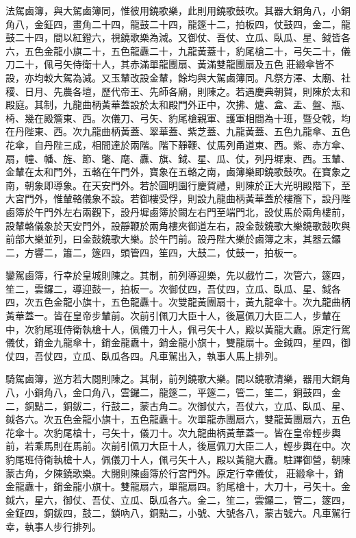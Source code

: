 \begin{pinyinscope}
法駕鹵簿，與大駕鹵簿同，惟彼用鐃歌樂，此則用鐃歌鼓吹。其器大銅角八，小銅角八，金鉦四，畫角二十四，龍鼓二十四，龍篴十二，拍板四，仗鼓四，金二，龍鼓二十四，間以紅鐙六，視鐃歌樂為減。又御仗、吾仗、立瓜、臥瓜、星、鉞皆各六，五色金龍小旗二十，五色龍纛二十，九龍黃蓋十，豹尾槍二十，弓矢二十，儀刀二十，佩弓矢侍衛十人，其赤滿單龍團扇、黃滿雙龍團扇及五色莊緞傘皆不設，亦均較大駕為減。又玉輦改設金輦，餘均與大駕鹵簿同。凡祭方澤、太廟、社稷、日月、先農各壇，歷代帝王、先師各廟，則陳之。若遇慶典朝賀，則陳於太和殿庭。其制，九龍曲柄黃華蓋設於太和殿門外正中，次拂、爐、盒、盂、盤、瓶、椅、幾在殿簷東、西。次儀刀、弓矢、豹尾槍親軍、護軍相間為十班，暨殳戟，均在丹陛東、西。次九龍曲柄黃蓋、翠華蓋、紫芝蓋、九龍黃蓋、五色九龍傘、五色花傘，自丹陛三成，相間達於兩階。階下靜鞭、仗馬列甬道東、西。紫、赤方傘、扇，幢、幡、旌、節、氅、麾、纛、旗、鉞、星、瓜、仗，列丹墀東、西。玉輦、金輦在太和門外，五輅在午門外，寶象在五輅之南，鹵簿樂即鐃歌鼓吹。在寶象之南，朝象即導象。在天安門外。若於圓明園行慶賀禮，則陳於正大光明殿階下，至大宮門外，惟輦輅儀象不設。若御樓受俘，則設九龍曲柄黃華蓋於樓簷下，設丹陛鹵簿於午門外左右兩觀下，設丹墀鹵簿於闕左右門至端門北，設仗馬於兩角樓前，設輦輅儀象於天安門外，設靜鞭於兩角樓夾御道左右，設金鼓鐃歌大樂鐃歌鼓吹與前部大樂並列，曰金鼓鐃歌大樂。於午門前。設丹陛大樂於鹵簿之末，其器云鑼二，方響二，簫二，篴四，頭管四，笙四，大鼓二，仗鼓一，拍板一。

鑾駕鹵簿，行幸於皇城則陳之。其制，前列導迎樂，先以戲竹二，次管六，篴四，笙二，雲鑼二，導迎鼓一，拍板一。次御仗四，吾仗四，立瓜、臥瓜、星、鉞各四，次五色金龍小旗十，五色龍纛十。次雙龍黃團扇十，黃九龍傘十。次九龍曲柄黃華蓋一。皆在皇帝步輦前。次前引佩刀大臣十人，後扈佩刀大臣二人，步輦在中，次豹尾班侍衛執槍十人，佩儀刀十人，佩弓矢十人，殿以黃龍大纛。原定行駕儀仗，銷金九龍傘十，銷金龍纛十，銷金龍小旗十，雙龍扇十。金鉞四，星四，御仗四，吾仗四，立瓜、臥瓜各四。凡車駕出入，執事人馬上排列。

騎駕鹵簿，巡方若大閱則陳之。其制，前列鐃歌大樂。間以鐃歌清樂，器用大銅角八，小銅角八，金口角八，雲鑼二，龍篴二，平篴二，管二，笙二，銅鼓四，金二，銅點二，銅鈸二，行鼓二，蒙古角二。次御仗六，吾仗六，立瓜、臥瓜、星、鉞各六。次五色金龍小旗十，五色龍纛十。次單龍赤團扇六，雙龍黃團扇六，五色花傘十。次豹尾槍十，弓矢十，儀刀十。次九龍曲柄黃華蓋一。皆在皇帝輕步輿前，若乘馬則在馬前。次前引佩刀大臣十人，後扈佩刀大臣二人，輕步輿在中。次豹尾班侍衛執槍十人，佩儀刀十人，佩弓矢十人，殿以黃龍大纛。駐蹕御營，朝陳蒙古角，夕陳鐃歌樂。大閱則陳鹵簿於行宮門外。原定行幸儀仗，莊緞傘十，銷金龍纛十，銷金龍小旗十。雙龍扇六，單龍扇四。豹尾槍十，大刀十，弓矢十。金鉞六，星六，御仗、吾仗、立瓜、臥瓜各六。金二，笙二，雲鑼二，管二，篴四，金鉦四，銅鈸四，鼓二，鎖吶八，銅點二，小號、大號各八，蒙古號六。凡車駕行幸，執事人步行排列。


\end{pinyinscope}
